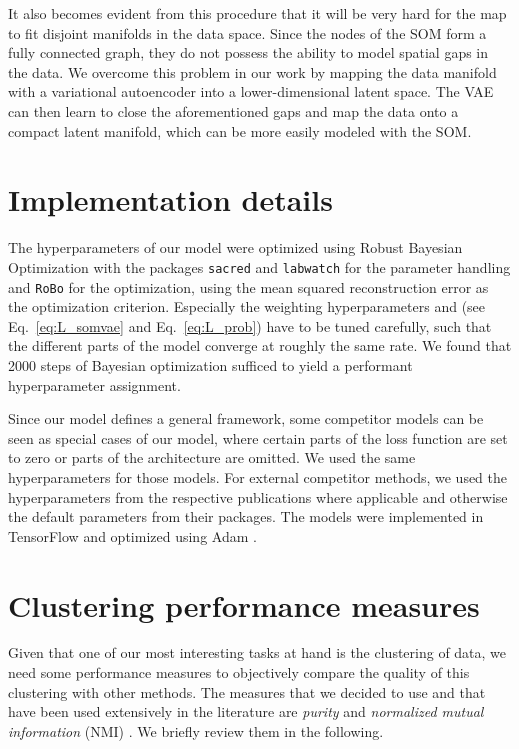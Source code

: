 \documentclass{article}
\begin{document}
It also becomes evident from this procedure that it will be very hard for the map to fit disjoint manifolds in the data space.
Since the nodes of the SOM form a fully connected graph, they do not possess the ability to model spatial gaps in the data.
We overcome this problem in our work by mapping the data manifold with a variational autoencoder into a lower-dimensional latent space.
The VAE can then learn to close the aforementioned gaps and map the data onto a compact latent manifold, which can be more easily modeled with the SOM.



\section{Implementation details}\label{sec:implementation}

The hyperparameters of our model were optimized using Robust Bayesian Optimization with the packages \texttt{sacred} and \texttt{labwatch} \citep{Greff2017a} for the parameter handling and \texttt{RoBo} \citep{Klein2017} for the optimization, using the mean squared reconstruction error as the optimization criterion.
Especially the weighting hyperparameters  and  (see Eq.~\eqref{eq:L_somvae} and Eq.~\eqref{eq:L_prob}) have to be tuned carefully, such that the different parts of the model converge at roughly the same rate.
We found that 2000 steps of Bayesian optimization sufficed to yield a performant hyperparameter assignment.

Since our model defines a general framework, some competitor models can be seen as special cases of our model, where certain parts of the loss function are set to zero or parts of the architecture are omitted.
We used the same hyperparameters for those models.
For external competitor methods, we used the hyperparameters from the respective publications where applicable and otherwise the default parameters from their packages.
The models were implemented in TensorFlow \citep{GoogleResearch2015} and optimized using Adam \citep{Kingma2015}.


\section{Clustering performance measures}\label{sec:clustering_performance}

Given that one of our most interesting tasks at hand is the clustering of data, we need some performance measures to objectively compare the quality of this clustering with other methods.
The measures that we decided to use and that have been used extensively in the literature are \emph{purity} and \emph{normalized mutual information} (NMI) \citep{Manning2008}.
We briefly review them in the following.
\end{document}
